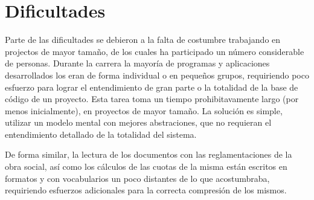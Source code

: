 \section{Dificultades}
Parte de las dificultades se debieron a la falta de costumbre trabajando en projectos de mayor tamaño, de los cuales ha participado un número considerable de personas. Durante la carrera la mayoría de programas y aplicaciones desarrollados los eran de forma individual o en pequeños grupos, requiriendo poco esfuerzo para lograr el entendimiento de gran parte o la totalidad de la base de código de un proyecto. Esta tarea toma un tiempo prohibitavamente largo (por menos inicialmente), en proyectos de mayor tamaño. La solución es simple, utilizar un modelo mental con mejores abstraciones, que no requieran el entendimiento detallado de la totalidad del sistema.

De forma similar, la lectura de los documentos con las reglamentaciones de la obra social, así como los cálculos de las cuotas de la misma están escritos en formatos y con vocabularios un poco distantes de lo que acostumbraba, requiriendo esfuerzos adicionales para la correcta compresión de los mismos.

